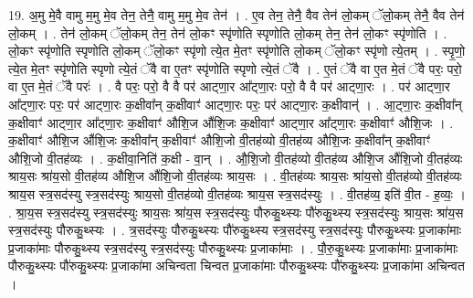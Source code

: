 \documentclass[17pt]{extarticle}
\begin{document}
19. अ॒मु मे॒वै वामु म॒मु मे॒व तेन॒ तेनै॒ वामु म॒मु मे॒व तेन॑ । . ए॒व तेन॒ तेनै॒ वैव तेन॑ लो॒कम् ॅलो॒कम् तेनै॒ वैव तेन॑ लो॒कम् । . तेन॑ लो॒कम् ॅलो॒कम् तेन॒ तेन॑ लो॒कꣳ स्पृ॑णोति स्पृणोति लो॒कम् तेन॒ तेन॑ लो॒कꣳ स्पृ॑णोति । . लो॒कꣳ स्पृ॑णोति स्पृणोति लो॒कम् ॅलो॒कꣳ स्पृ॑णो त्ये॒त मे॒तꣳ स्पृ॑णोति लो॒कम् ॅलो॒कꣳ स्पृ॑णो त्ये॒तम् । . स्पृ॒णो॒ त्ये॒त मे॒तꣳ स्पृ॑णोति स्पृणो त्ये॒तं ॅवै वा ए॒तꣳ स्पृ॑णोति स्पृणो त्ये॒तं ॅवै । . ए॒तं ॅवै वा ए॒त मे॒तं ॅवै परः॒ परो॒ वा ए॒त मे॒तं ॅवै परः॑ । . वै परः॒ परो॒ वै वै पर॑ आट्णा॒र आ᳚ट्णा॒रः परो॒ वै वै पर॑ आट्णा॒रः । . पर॑ आट्णा॒र आ᳚ट्णा॒रः परः॒ पर॑ आट्णा॒रः क॒क्षीवा᳚न् क॒क्षीवाꣳ॑ आट्णा॒रः परः॒ पर॑ आट्णा॒रः क॒क्षीवान्॑ । . आ॒ट्णा॒रः क॒क्षीवा᳚न् क॒क्षीवाꣳ॑ आट्णा॒र आ᳚ट्णा॒रः क॒क्षीवाꣳ॑ औशि॒ज औ॑शि॒जः क॒क्षीवाꣳ॑ आट्णा॒र आ᳚ट्णा॒रः क॒क्षीवाꣳ॑ औशि॒जः । . क॒क्षीवाꣳ॑ औशि॒ज औ॑शि॒जः क॒क्षीवा᳚न् क॒क्षीवाꣳ॑ औशि॒जो वी॒तह॑व्यो वी॒तह॑व्य औशि॒जः क॒क्षीवा᳚न् क॒क्षीवाꣳ॑ औशि॒जो वी॒तह॑व्यः । . क॒क्षीवा॒निति॑ क॒क्षी - वा॒न् । . औ॒शि॒जो वी॒तह॑व्यो वी॒तह॑व्य औशि॒ज औ॑शि॒जो वी॒तह॑व्यः श्राय॒सः श्रा॑य॒सो वी॒तह॑व्य औशि॒ज औ॑शि॒जो वी॒तह॑व्यः श्राय॒सः । . वी॒तह॑व्यः श्राय॒सः श्रा॑य॒सो वी॒तह॑व्यो वी॒तह॑व्यः श्राय॒स स्त्र॒सद॑स्यु स्त्र॒सद॑स्युः श्राय॒सो वी॒तह॑व्यो वी॒तह॑व्यः श्राय॒स स्त्र॒सद॑स्युः । . वी॒तह॑व्य॒ इति॑ वी॒त - ह॒व्यः॒ । . श्रा॒य॒स स्त्र॒सद॑स्यु स्त्र॒सद॑स्युः श्राय॒सः श्रा॑य॒स स्त्र॒सद॑स्युः पौरुकु॒थ्स्यः पौ॑रुकु॒थ्स्य स्त्र॒सद॑स्युः श्राय॒सः श्रा॑य॒स स्त्र॒सद॑स्युः पौरुकु॒थ्स्यः । . त्र॒सद॑स्युः पौरुकु॒थ्स्यः पौ॑रुकु॒थ्स्य स्त्र॒सद॑स्यु स्त्र॒सद॑स्युः पौरुकु॒थ्स्यः प्र॒जाका॑माः प्र॒जाका॑माः पौरुकु॒थ्स्य स्त्र॒सद॑स्यु स्त्र॒सद॑स्युः पौरुकु॒थ्स्यः प्र॒जाका॑माः । . पौ॒रु॒कु॒थ्स्यः प्र॒जाका॑माः प्र॒जाका॑माः पौरुकु॒थ्स्यः पौ॑रुकु॒थ्स्यः प्र॒जाका॑मा अचिन्वता चिन्वत प्र॒जाका॑माः पौरुकु॒थ्स्यः पौ॑रुकु॒थ्स्यः प्र॒जाका॑मा अचिन्वत । \newline
\end{document}
